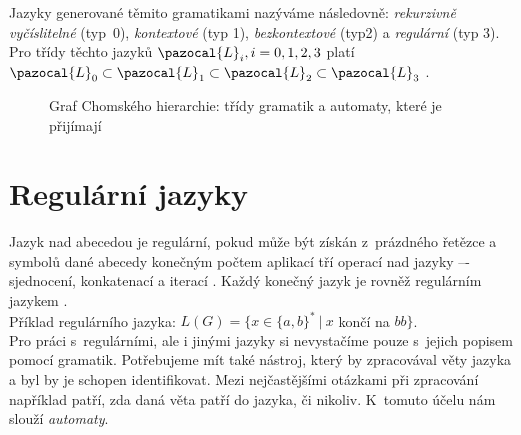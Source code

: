 Jazyky generované těmito gramatikami nazýváme následovně: \textit{rekurzivně vyčíslitelné} \mbox{(typ 0)}, \textit{kontextové}
(typ 1), \textit{bezkontextové} (typ2) a \textit{regulární} (typ 3). Pro třídy těchto jazyků $\pazocal{L}_i, i = 0, 1, 2, 3$ 
platí $\pazocal{L}_0 \subset \pazocal{L}_1 \subset \pazocal{L}_2 \subset \pazocal{L}_3$ 
\cite[str. 17]{TIN2013}. \\

\begin{figure}[h!]
    \label{fig:chomsky}
    \centering
{}
    \caption{Graf Chomského hierarchie: třídy gramatik a automaty, které je přijímají}
\end{figure}
\newpage
\section{Regulární jazyky} \label{sec:2:reg}
Jazyk nad abecedou je regulární, pokud může být získán z~prázdného řetězce a symbolů dané abecedy konečným počtem aplikací tří operací nad 
jazyky –- sjednocení, konkatenací a iterací \cite[str. 29]{Meduna2014}. Každý konečný jazyk je rovněž regulárním jazykem \cite[str. 47]{TIN2013}. \\

\Bat{} Příklad regulárního jazyka: $L(G) = \{x \in \{a, b\}^* \ | \ x$ končí na $ bb\}$. \\

Pro práci s~regulárními, ale i jinými jazyky si nevystačíme pouze s~jejich popisem pomocí gramatik. Potřebujeme mít také nástroj, který by 
zpracovával věty jazyka a byl by je schopen identifikovat. Mezi nejčastějšími otázkami při zpracování například patří, zda daná věta patří 
do jazyka, či nikoliv. K~tomuto účelu nám slouží \textit{automaty}. \\

